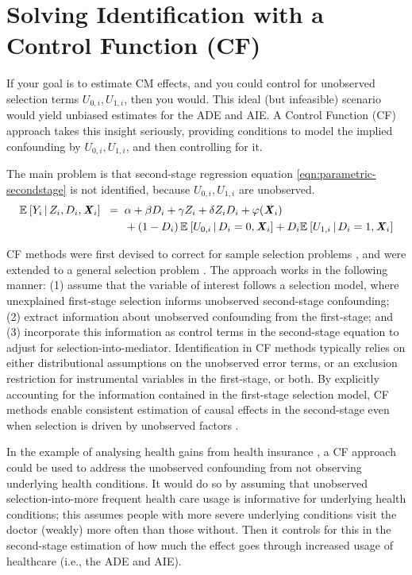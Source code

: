 \section{Solving Identification with a Control Function (CF)}
\label{sec:selectionmodel}
If your goal is to estimate CM effects, and you could control for unobserved selection terms $U_{0,i}, U_{1,i}$, then you would.
This ideal (but infeasible) scenario would yield unbiased estimates for the ADE and AIE.
A Control Function (CF) approach takes this insight seriously, providing conditions to model the implied confounding by $U_{0,i}, U_{1,i}$, and then controlling for it.

The main problem is that second-stage regression equation \eqref{eqn:parametric-secondstage} is not identified, because $U_{0,i},U_{1,i}$ are unobserved.
\begin{align}
    \label{eqn:secondstage-reg}
    \mathbb{E}_{} \left[ Y_i \, \middle\vert \, Z_i, D_i, \boldsymbol{\mathit{X}}_i \right] \;\; =& \;\;
        \alpha
        + \beta D_i
        + \gamma Z_i
        + \delta Z_i D_i
        + \varphi(\boldsymbol{\mathit{X}}_i) \\
        & \;\; +\left( 1 - D_i \right) \mathbb{E}_{} \left[  U_{0,i}  \, \middle\vert \, D_i = 0, \boldsymbol{\mathit{X}}_i \right]
            + D_i \mathbb{E}_{} \left[  U_{1,i}  \, \middle\vert \, D_i = 1, \boldsymbol{\mathit{X}}_i \right] 
        \nonumber
\end{align}

CF methods were first devised to correct for sample selection problems \citep{heckman1974shadow}, and were extended to a general selection problem \citep{heckman1979sample}.
The approach works in the following manner: (1) assume that the variable of interest follows a selection model, where unexplained first-stage selection informs unobserved second-stage confounding; (2) extract information about unobserved confounding from the first-stage; and (3) incorporate this information as control terms in the second-stage equation to adjust for selection-into-mediator.
Identification in CF methods typically relies on either distributional assumptions on the unobserved error terms, or an exclusion restriction for instrumental variables in the first-stage, or both.
By explicitly accounting for the information contained in the first-stage selection model, CF methods enable consistent estimation of causal effects in the second-stage even when selection is driven by unobserved factors \citep{florens2008identification}.

In the example of analysing health gains from health insurance \citep{finkelstein2008oregon}, a CF approach could be used to address the unobserved confounding from not observing underlying health conditions.
It would do so by assuming that unobserved selection-into-more frequent health care usage is informative for underlying health conditions; this assumes people with more severe underlying conditions visit the doctor (weakly) more often than those without.
Then it controls for this in the second-stage  estimation of how much the effect goes through increased usage of healthcare (i.e., the ADE and AIE).

